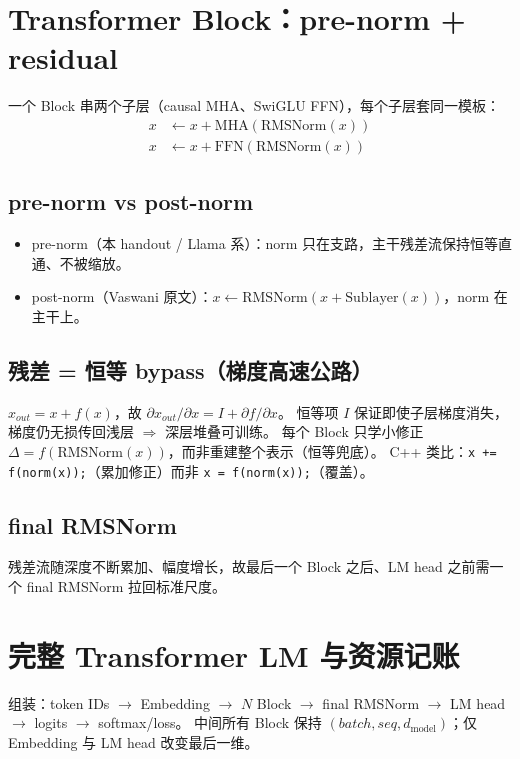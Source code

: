 \documentclass[12pt]{ctexart}
\begin{document}
\section{Transformer Block：pre-norm + residual}

一个 Block 串两个子层（causal MHA、SwiGLU FFN），每个子层套同一模板：
\begin{align}
x &\leftarrow x + \text{MHA}(\text{RMSNorm}(x)) \\
x &\leftarrow x + \text{FFN}(\text{RMSNorm}(x))
\end{align}

\subsection{pre-norm vs post-norm}
\begin{itemize}
  \item pre-norm（本 handout / Llama 系）：norm 只在支路，主干残差流保持恒等直通、不被缩放。
  \item post-norm（Vaswani 原文）：$x \leftarrow \text{RMSNorm}(x + \text{Sublayer}(x))$，norm 在主干上。
\end{itemize}

\subsection{残差 = 恒等 bypass（梯度高速公路）}
$x_{out}=x+f(x)$，故 $\partial x_{out}/\partial x = I + \partial f/\partial x$。
恒等项 $I$ 保证即使子层梯度消失，梯度仍无损传回浅层 $\Rightarrow$ 深层堆叠可训练。
每个 Block 只学小修正 $\Delta=f(\text{RMSNorm}(x))$，而非重建整个表示（恒等兜底）。
C++ 类比：\texttt{x += f(norm(x));}（累加修正）而非 \texttt{x = f(norm(x));}（覆盖）。

\subsection{final RMSNorm}
残差流随深度不断累加、幅度增长，故最后一个 Block 之后、LM head 之前需一个 final RMSNorm 拉回标准尺度。

\section{完整 Transformer LM 与资源记账}

组装：token IDs $\to$ Embedding $\to$ $N$ Block $\to$ final RMSNorm $\to$ LM head $\to$ logits $\to$ softmax/loss。
中间所有 Block 保持 $(batch,seq,d_{\text{model}})$；仅 Embedding 与 LM head 改变最后一维。
\end{document}
